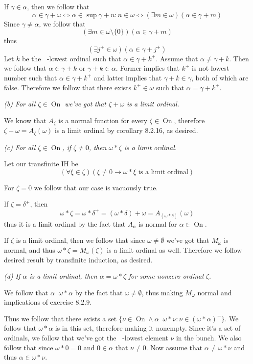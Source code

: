 \documentclass[11pt,oneside,titlepage]{book}
\DeclareMathOperator \lra {\Leftrightarrow}
\DeclareMathOperator \On {On}
\DeclareMathOperator \ineq {\underline{\in}}
\newcommand{\set}[1]{\{ #1 \}}
\begin{document}
If $\gamma \in \alpha$, then we follow that
$$\alpha \in \gamma + \omega \lra \alpha \in \sup{\gamma + n: n \in \omega} \lra
(\exists m \in \omega)(\alpha \in \gamma + m)$$
Since $\gamma \neq \alpha$, we follow that
$$(\exists m \in \omega \setminus \set{0})(\alpha \in \gamma + m)$$
thus
$$(\exists j^+ \in \omega )(\alpha \in \gamma + j^+)$$
Let $k$ be the $\ineq$-lowest ordinal such that $\alpha \in \gamma + k^+$.
Assume that $\alpha \neq \gamma + k$. Then we follow that $\alpha \in \gamma + k$
or $\gamma + k \in \alpha$. Former implies that $k^+$ is not lowest number such that
$\alpha \in \gamma + k^+$ and latter implies that $\gamma + k \in \gamma$,
both of which are false. Therefore we follow that there exists $k^+ \in \omega$
such that $\alpha = \gamma + k^+$.

\textit{(b) For all $\zeta \in \On$ we've got that $\zeta + \omega$ is a limit
  ordinal.}

We know that $A_\zeta$ is a normal function for every $\zeta \in \On$, therefore
$\zeta + \omega = A_\zeta(\omega)$ is a limit ordinal by corollary 8.2.16, as desired.

\textit{(c) For all $\zeta \in \On$, if $\zeta \neq 0$, then $\omega * \zeta$ is a limit
  ordinal.}

Let our transfinite IH be
$$(\forall \xi \in \zeta)(\xi \neq 0 \to \omega * \xi \text{ is a limit ordinal})$$

For $\zeta = 0$ we follow that our case is vacuously true.

If $\zeta = \delta^+$, then
$$\omega * \zeta = \omega * \delta^+ = (\omega * \delta) + \omega = A_{(\omega * \delta)}(\omega)$$
thus it is a limit ordinal by the fact that $A_\alpha$ is normal for $\alpha \in \On$.

If $\zeta$ is a limit ordinal, then we follow that since $\omega \neq \emptyset$
we've got that $M_\omega$ is normal, and thus $\omega * \zeta = M_\omega(\zeta)$ is a
limit ordinal as well. Therefore we follow desired result by transfinite induction, as desired.

\textit{(d) If $\alpha$ is a limit ordinal, then $\alpha = \omega * \zeta$ for
  some nonzero ordinal $\zeta$.}

We follow that $\alpha \ineq \omega * \alpha$ by the fact that $\omega \neq \emptyset$,
thus making $M_\omega$ normal and implications of exercise 8.2.9.

Thus we follow that there exists a set
$\set{\nu \in \On \land \alpha \ineq \omega * \nu: \nu \in (\omega * \alpha)^+}$.
We follow that $\omega * \alpha$ is in this set, therefore
making it nonempty.
Since it's a set of
ordinals, we follow that we've got the $\ineq$-lowest element $\nu$ in the bunch.
We also follow that since $\omega * 0 = 0$ and $0 \in \alpha$ that $\nu \neq 0$.
Now assume that $\alpha \neq \omega * \nu$ and thus $\alpha \in \omega * \nu$.
\end{document}
